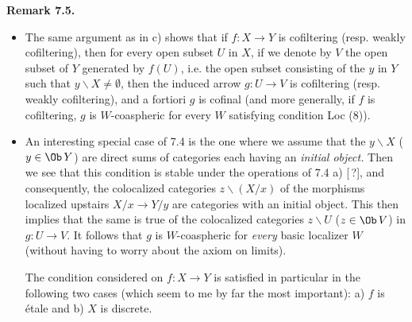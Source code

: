 \noindent\textbf{Remark 7.5.}
\begin{itemize}
\item[1)] The same argument as in c) shows that if $f : X \longrightarrow Y$ is cofiltering (resp. weakly cofiltering), then for every open subset $U$ in $X$, if we denote by $V$ the open subset of $Y$ generated by $f(U)$, i.e. the open subset consisting of the $y$ in $Y$ such that $y\backslash X \neq \emptyset$, then the induced arrow $g : U \longrightarrow V$ is cofiltering (resp. weakly cofiltering), and a fortiori $g$ is cofinal (and more generally, if $f$ is cofiltering, $g$ is $W$-coaspheric for every $W$ satisfying condition Loc (8)).

\item[2)] An interesting special case of 7.4 is the one where we assume that the $y\backslash X$ ($y \in \Ob\,Y$) are direct sums of categories each having an \textit{initial object.} Then we see that this condition is stable under the operations of 7.4 a) [\,?], and consequently, the colocalized categories $z\backslash(X/x)$ of the morphisms localized upstairs $X/x \longrightarrow Y/y$ are categories with an initial object. This then implies that the same is true of the colocalized categories $z\backslash U$ ($z \in \Ob\,V$) in $g : U \longrightarrow V$. It follows that $g$ is $W$-coaspheric for \textit{every} basic localizer $W$ (without having to worry about the axiom on limits).

The condition considered on $f : X \longrightarrow Y$ is satisfied in particular in the following two cases (which seem to me by far the most important): a) $f$ is étale and b) $X$ is discrete.
\end{itemize}

\clearpage
{}


